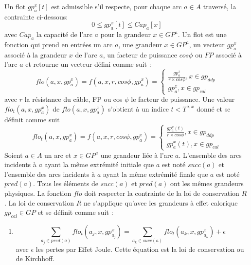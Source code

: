  \label{reglesLocales}
Un flot  $gp_{a}^{x}[t]$ est admissible s'il respecte, pour chaque arc $a \in A$ travers\'e, la contrainte ci-dessous:
\begin{equation}
	0 \le  gp_{a}^{x}[t] \le Cap_{a}[x]
\end{equation}	
avec $Cap_{a}$ la capacit\'e de l'arc $a$ pour la grandeur $x \in GP^{a}$.
\newline
Un flot est une fonction qui prend en entr\'ees 
un arc $a$, 
une grandeur $x \in GP^{a}$, 
un vecteur $gp_{a}^{x}$ associ\'e \`a la grandeur $x$ de l'arc $a$, 
un facteur de puissance $cos \phi$ ou $FP$ associ\'e  \`a l'arc $a$
et retourne un vecteur d\'efini comme suit :
\begin{equation}
	flo(a,x,gp_{a}^{x}) = f(a, x, r, cos \phi, gp_{a}^{x}) =
	\begin{cases}
		 \frac{  gp_{a}^{x} }{r \times cos \phi}, x \in gp_{ddp} \\
		 gp_{a}^{x} , x \in gp_{cal}
	\end{cases}
\end{equation}
avec $r$ la r\'esistance du c\^able, FP ou cos $\phi$ le facteur de puissance.
\newline
Une valeur $flo_{t}(a,x,gp_{a}^{x})$ de $flo(a,x,gp_{a}^{x})$ s'obtient \`a un indice $t < T^{a, x}$ donn\'e et se d\'efinit comme suit 
\begin{equation}
	flo_t(a,x,gp_{a}^{x}) = f(a, x, r, cos \phi, gp_{a}^{x}) =
	\begin{cases}
		 \frac{  gp_{a}^{x}(t) }{r \times cos \phi}, x \in gp_{ddp} \\
		 gp_{a}^{x}(t) , x \in gp_{cal}
	\end{cases}
\end{equation}
Soient $a \in A$ un arc et $x \in GP^{a}$ une grandeur li\'ee \`a l'arc $a$.
L'ensemble des arcs incidents \`a $a$ ayant la m\^eme extr\'emit\'e initiale que $a$ est not\'e  $succ(a)$ et 
 l'ensemble des arcs incidents \`a $a$ ayant la m\^eme extr\'emit\'e finale que $a$ est not\'e $pred(a)$.
 Tous les \'el\'ements de $succ(a)$ et $pred(a)$ ont les m\^emes grandeurs physiques. 
 \newline
La fonction $flo$ doit respecter la contrainte de la loi de conservation $R$ \cite{loiDeConservation}. La loi de  conservation $R$ ne s'applique qu'avec les grandeurs \`a effet calorique $gp_{cal} \in GP$ et se d\'efinit  comme suit :
\begin{enumerate}
		\item[] 
			\begin{equation}
				\sum_{a_{j} \in pred(a)} flo_t(a_{j},x,gp_{a_{j}}^{x}) = \sum_{a_{k} \in succ(a)} flo_t(a_{k},x,gp_{a_{k}}^{x}) + \epsilon 
			\end{equation}
		avec $\epsilon$ les pertes par Effet Joule. Cette \'equation est la loi de conservation ou de Kirchhoff.

\end{enumerate}

